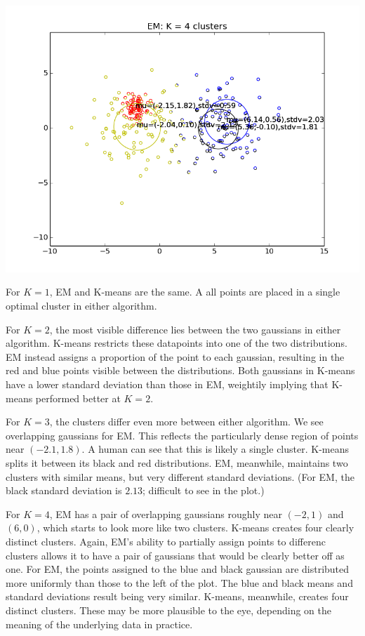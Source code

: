 \documentclass{article}
\begin{document}
\begin{center}
      \includegraphics[scale=0.4]{sec1d_k4.png} \\
    \end{center} 
    
    For $K = 1$, EM and K-means are the same. A all points are placed in a single optimal cluster in either algorithm. 

    For $K=2$, the most visible difference lies between the two gaussians in either algorithm.  K-means restricts these datapoints into one of the two distributions. EM instead assigns a proportion of the point to each gaussian, resulting in the red and blue points visible between the distributions. Both gaussians in K-means have a lower standard deviation than those in EM, weightily implying that K-means performed better at $K=2$.

    For $K=3$, the clusters differ even more between either algorithm. We see overlapping gaussians for EM. This reflects the particularly dense region of points near $(-2.1,1.8)$. A human can see that this is likely a single cluster. K-means splits it between its black and red distributions. EM, meanwhile, maintains two clusters with similar means, but very different standard deviations. (For EM, the black standard deviation is $2.13$; difficult to see in the plot.)

    For $K=4$, EM has a pair of overlapping gaussians roughly near $(-2, 1)$ and $(6,0)$, which starts to look more like two clusters. K-means creates four clearly distinct clusters. Again, EM's ability to partially assign points to differenc clusters allows it to have a pair of gaussians that would be clearly better off as one. For EM, the points assigned to the blue and black gaussian are distributed more uniformly than those to the left of the plot. The blue and black means and standard deviations result being very similar. K-means, meanwhile, creates four distinct clusters. These may be more plausible to the eye, depending on the meaning of the underlying data in practice. 
\end{document}
